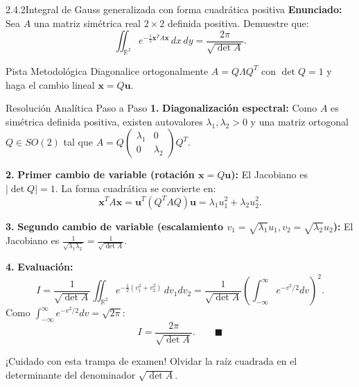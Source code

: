 \documentclass[11pt,a4paper]{article}
\begin{document}
\begin{nivelbox}{2.4.2}{Integral de Gauss generalizada con forma cuadrática positiva}
\textbf{Enunciado:}\\
Sea $A$ una matriz simétrica real $2 \times 2$ definida positiva. Demuestre que:
\[\iint_{\mathbb{R}^2} e^{-\frac{1}{2} \mathbf{x}^T A \mathbf{x}} \, dx \, dy = \frac{2\pi}{\sqrt{\det A}}.\]

\begin{observacionbox}{Pista Metodológica}
Diagonalice ortogonalmente $A = Q \Lambda Q^T$ con $\det Q = 1$ y haga el cambio lineal $\mathbf{x} = Q \mathbf{u}$.
\end{observacionbox}

\begin{ejerciciobox}{Resolución Analítica Paso a Paso}
\smallskip\noindent\textbf{1.} \textbf{Diagonalización espectral:}
Como $A$ es simétrica definida positiva, existen autovalores $\lambda_1, \lambda_2 > 0$ y una matriz ortogonal $Q \in SO(2)$ tal que $A = Q \begin{pmatrix} \lambda_1 & 0 \\ 0 & \lambda_2 \end{pmatrix} Q^T$.

\smallskip\noindent\textbf{2.} \textbf{Primer cambio de variable (rotación $\mathbf{x} = Q\mathbf{u}$):}
El Jacobiano es $|\det Q| = 1$. La forma cuadrática se convierte en:
\[\mathbf{x}^T A \mathbf{x} = \mathbf{u}^T (Q^T A Q) \mathbf{u} = \lambda_1 u_1^2 + \lambda_2 u_2^2.\]

\smallskip\noindent\textbf{3.} \textbf{Segundo cambio de variable (escalamiento $v_1 = \sqrt{\lambda_1} u_1, v_2 = \sqrt{\lambda_2} u_2$):}
El Jacobiano es $\frac{1}{\sqrt{\lambda_1 \lambda_2}} = \frac{1}{\sqrt{\det A}}$.

\smallskip\noindent\textbf{4.} \textbf{Evaluación:}
\[I = \frac{1}{\sqrt{\det A}} \iint_{\mathbb{R}^2} e^{-\frac{1}{2}(v_1^2 + v_2^2)} \, dv_1 dv_2 = \frac{1}{\sqrt{\det A}} \left( \int_{-\infty}^\infty e^{-v^2/2} dv \right)^2.\]
Como $\int_{-\infty}^\infty e^{-v^2/2} dv = \sqrt{2\pi}$:
\[I = \frac{2\pi}{\sqrt{\det A}}. \qquad \blacksquare\]
\end{ejerciciobox}

\begin{errorbox}{¡Cuidado con esta trampa de examen!}
Olvidar la raíz cuadrada en el determinante del denominador $\sqrt{\det A}$.
\end{errorbox}
\end{nivelbox}
\bigskip
\end{document}
